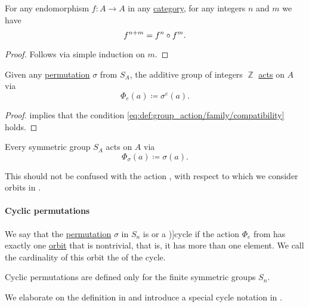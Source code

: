 \begin{lemma}\label{thm:sum_of_powers_in_composition}
  For any endomorphism \( f: A \to A \) in any \hyperref[def:category]{category}, for any integers \( n \) and \( m \) we have
  \begin{equation*}
    f^{n + m} = f^n \bincirc f^m.
  \end{equation*}
\end{lemma}
\begin{proof}
  Follows via simple induction on \( m \).
\end{proof}

\begin{proposition}\label{thm:symmetric_group_action}
  Given any \hyperref[def:symmetric_group]{permutation} \( \sigma \) from \( S_A \), the additive group of integers \( \BbbZ \) \hyperref[def:group_action]{acts} on \( A \) via
  \begin{equation*}
    \Phi_e(a) \coloneqq \sigma^e(a).
  \end{equation*}
\end{proposition}
\begin{proof}
   implies that the condition \eqref{eq:def:group_action/family/compatibility} holds.
\end{proof}

\begin{remark}\label{rem:symmetric_group_actions}
  Every symmetric group \( S_A \) acts on \( A \) via
  \begin{equation*}
    \Phi_\sigma(a) \coloneqq \sigma(a).
  \end{equation*}

  This should not be confused with the action , with respect to which we consider orbits in .
\end{remark}

\paragraph{Cyclic permutations}

\begin{definition}\label{def:cyclic_permutation}
  We say that the \hyperref[def:symmetric_group]{permutation} \( \sigma \) in \( S_n \) is  or a \term[ru=цикл (\cite[sec. 4.3]{Тыртышников2007ЛинейнаяАлгебра})]{cycle} if the action \( \Phi_e \) from  has exactly one \hyperref[def:group_action_orbit]{orbit} that is nontrivial, that is, it has more than one element. We call the cardinality of this orbit the  of the cycle.
\end{definition}
\begin{comments}
  \item Cyclic permutations are defined only for the finite symmetric groups \( S_n \).
  \item We elaborate on the definition in  and introduce a special cycle notation in .
\end{comments}

